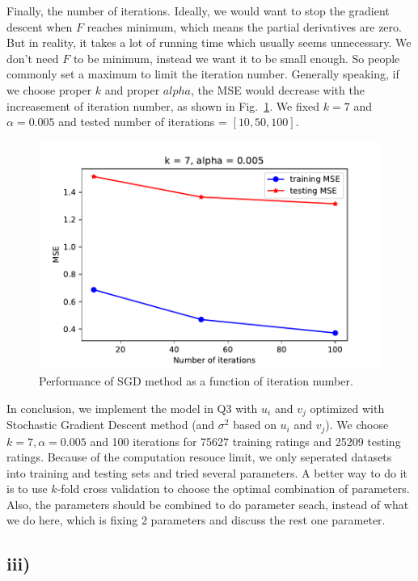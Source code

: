 \documentclass[twoside,11pt]{homework}
\begin{document}
Finally, the number of iterations. 
Ideally, we would want to stop the gradient descent when $F$ reaches minimum, which means the partial derivatives are zero. 
But in reality, it takes a lot of running time which usually seems unnecessary.
We don't need $F$ to be minimum, instead we want it to be small enough.
So people commonly set a maximum to limit the iteration number. 
Generally speaking, if we choose proper $k$ and proper $alpha$, the MSE would decrease with the increasement of iteration number, as shown in Fig.~\ref{FnIter}.
We fixed $k=7$ and $\alpha = 0.005$ and tested number of iterations = $[10, 50, 100]$.
%
\begin{figure}[ht]
\centering
\includegraphics[]{nIterTest.pdf}
\caption{Performance of SGD method as a function of iteration number.}
\label{FnIter}
\end{figure}
%

In conclusion, we implement the model in Q3 with $u_i$ and $v_j$ optimized with Stochastic Gradient Descent method (and $\sigma^2$ based on $u_i$ and $v_j$).
We choose $k = 7, \alpha = 0.005$ and 100 iterations for 75627 training ratings and 25209 testing ratings.
Because of the computation resouce limit, we only seperated datasets into training and testing sets and tried several parameters.
A better way to do it is to use $k$-fold cross validation to choose the optimal combination of parameters.
Also, the parameters should be combined to do parameter seach, instead of what we do here, which is fixing 2 parameters and discuss the rest one parameter.

\subsection*{iii)}
 
\end{document}
